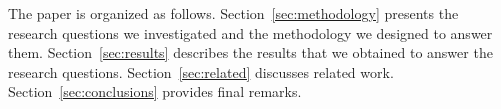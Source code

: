 The paper is organized as follows. Section~\ref{sec:methodology} presents the research questions we investigated and the methodology we designed to answer them. Section~\ref{sec:results} describes the results that we obtained to answer the research questions. Section~\ref{sec:related} discusses related work. Section~\ref{sec:conclusions} provides final remarks. 
